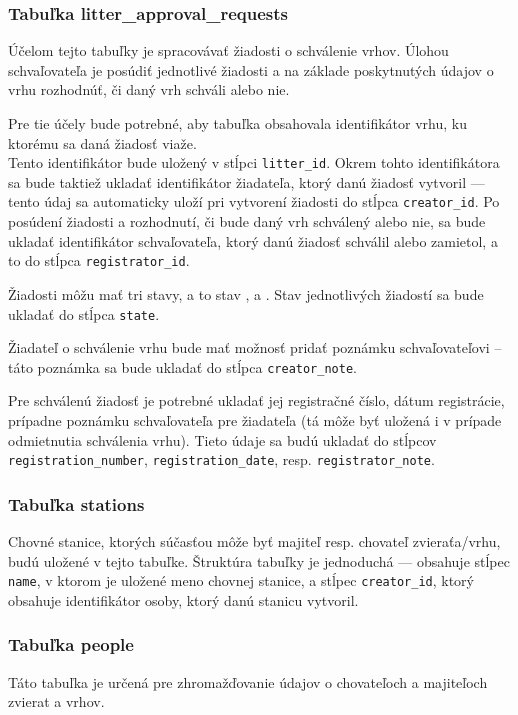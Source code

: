 \subsubsection{Tabuľka litter\_approval\_requests}
Účelom tejto tabuľky je spracovávať žiadosti o schválenie vrhov. Úlohou schvaľovateľa je posúdiť jednotlivé žiadosti a na základe poskytnutých údajov o vrhu rozhodnúť, či daný vrh schváli alebo nie.

Pre tie účely bude potrebné, aby tabuľka obsahovala identifikátor vrhu, ku ktorému sa daná žiadosť viaže. \\ Tento identifikátor bude uložený v stĺpci \texttt{litter_id}. Okrem tohto identifikátora sa bude taktiež ukladať identifikátor žiadateľa, ktorý danú žiadosť vytvoril --- tento údaj sa automaticky uloží pri vytvorení žiadosti do stĺpca \texttt{creator_id}. Po posúdení žiadosti a rozhodnutí, či bude daný vrh schválený alebo nie, sa bude ukladať identifikátor schvaľovateľa, ktorý danú žiadosť schválil alebo zamietol, a to do stĺpca \texttt{registrator_id}.

Žiadosti môžu mať tri stavy, a to stav ,  a . Stav jednotlivých žiadostí sa bude ukladať do stĺpca \texttt{state}.

Žiadateľ o schválenie vrhu bude mať možnosť pridať poznámku schvaľovateľovi -- táto poznámka sa bude ukladať do stĺpca \texttt{creator_note}.

Pre schválenú žiadosť je potrebné ukladať jej registračné číslo, dátum registrácie, prípadne poznámku schvaľovateľa pre žiadateľa (tá môže byť uložená i v prípade odmietnutia schválenia vrhu). Tieto údaje sa budú ukladať do stĺpcov \texttt{registration_number}, \texttt{registration_date}, resp. \texttt{registrator_note}.

\subsubsection{Tabuľka stations}
Chovné stanice, ktorých súčasťou môže byť majiteľ resp. chovateľ zvieraťa/vrhu, budú uložené v tejto tabuľke.
Štruktúra tabuľky je jednoduchá --- obsahuje stĺpec \texttt{name}, v ktorom je uložené meno chovnej stanice, a stĺpec \texttt{creator_id}, ktorý obsahuje identifikátor osoby, ktorý danú stanicu vytvoril.

\subsubsection{Tabuľka people}
Táto tabuľka je určená pre zhromažďovanie údajov o chovateľoch a majiteľoch zvierat a vrhov.


